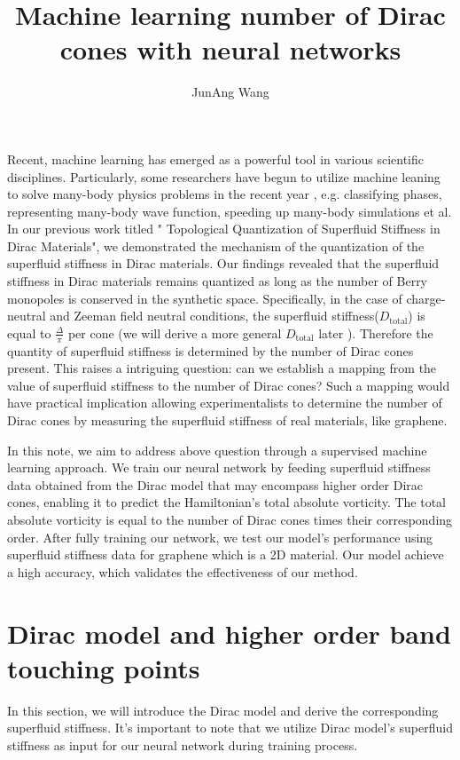 \documentclass{article}
\title{Machine learning number of Dirac cones with neural networks}
\author{JunAng Wang}
\begin{document}
\maketitle
Recent, machine learning has emerged as a powerful tool in various scientific disciplines. Particularly, some researchers have begun to utilize  machine leaning to solve many-body physics problems in the recent year \cite{carleo2019machine,carrasquilla2020machine,johnston2022perspective}, e.g. classifying phases\cite{carrasquilla2017machine,wang2016discovering,tanaka2017detection,zhang2018machine}, representing many-body wave function\cite{carleo2017solving,sharir2020deep}, speeding up many-body simulations\cite{chen2018symmetry,wu2019solving,nagai2017self,liu2017self} et al.   In our previous work titled " Topological Quantization of Superfluid Stiffness in Dirac Materials"\cite{wang2022topological}, we demonstrated the mechanism of the quantization of the superfluid stiffness in Dirac materials. Our findings revealed that the superfluid stiffness in Dirac materials remains quantized as long as the number of Berry monopoles is conserved in the synthetic space. Specifically, in the case of charge-neutral and Zeeman field neutral conditions, the superfluid stiffness($ D_{\textrm{total}}  $) is equal to $  \frac{\Delta}{\pi}  $  per cone (we will derive a more general $ D_{\textrm{total}} $ later ). Therefore the quantity of superfluid stiffness is determined by the number of Dirac cones present. This raises a intriguing question: can we establish a mapping from the value of superfluid stiffness to the number of Dirac cones? Such a mapping would have practical implication allowing experimentalists to determine the number of Dirac cones by measuring the superfluid stiffness of real materials, like graphene.

In this note, we aim to address above question through a supervised machine learning approach. We train our neural network by feeding superfluid stiffness data obtained from the Dirac model that may encompass higher order Dirac cones, enabling it to predict the Hamiltonian's total absolute vorticity. The total absolute vorticity is equal to the number of Dirac cones times their corresponding order.  After fully training our network, we test our model's performance using superfluid stiffness data for graphene which is a 2D material. Our model achieve a high accuracy, which validates the effectiveness of our method.

\section{Dirac model and higher order band touching points}
In this section, we will introduce the Dirac model and derive the corresponding superfluid stiffness. It's important to note that we utilize Dirac model's superfluid stiffness as input for our neural network during training process.
\end{document}
